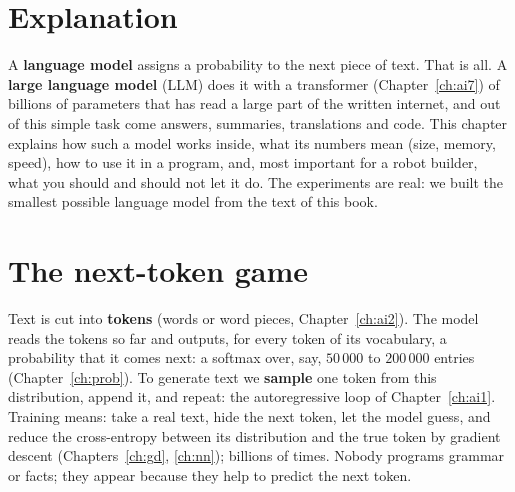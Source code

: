 \label{ch:ai8}

\section*{Explanation}
A \textbf{language model} assigns a probability to the next piece of text. That is all. A \textbf{large language model} (LLM) does it with a transformer (Chapter~\ref{ch:ai7}) of billions of parameters that has read a large part of the written internet, and out of this simple task come answers, summaries, translations and code. This chapter explains how such a model works inside, what its numbers mean (size, memory, speed), how to use it in a program, and, most important for a robot builder, what you should and should not let it do. The experiments are real: we built the smallest possible language model from the text of this book.

\section*{The next-token game}
Text is cut into \textbf{tokens} (words or word pieces, Chapter~\ref{ch:ai2}). The model reads the tokens so far and outputs, for every token of its vocabulary, a probability that it comes next: a softmax over, say, $50\,000$ to $200\,000$ entries (Chapter~\ref{ch:prob}). To generate text we \textbf{sample} one token from this distribution, append it, and repeat: the autoregressive loop of Chapter~\ref{ch:ai1}. Training means: take a real text, hide the next token, let the model guess, and reduce the cross-entropy between its distribution and the true token by gradient descent (Chapters~\ref{ch:gd}, \ref{ch:nn}); billions of times. Nobody programs grammar or facts; they appear because they help to predict the next token.

